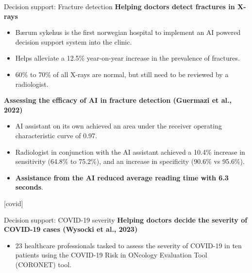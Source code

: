 \documentclass[8pt]{beamer}
\begin{document}
	\begin{frame}[t]{Decision support: Fracture detection}
		\textbf{Helping doctors detect fractures in X-rays}\\
		\begin{itemize}
			\item Bærum sykehus is the first norwegian hospital to implement an AI powered decision support system into the clinic.
			\item Helps alleviate a 12.5\% year-on-year increase in the prevalence of fractures.
			\item 60\% to 70\% of all X-rays are normal, but still need to be reviewed by a radiologist.
		\end{itemize}
		\textbf{Assessing the efficacy of AI in fracture detection (Guermazi et al., 2022)}\\
		\begin{itemize}
			\item AI assistant on its own achieved an area under the receiver operating characteristic curve of 0.97.
			\item Radiologist in conjunction with the AI assistant achieved a 10.4\% increase in sensitivity (64.8\% to 75.2\%), and an increase in specificity (90.6\% vs 95.6\%).
			\item \textbf{Assistance from the AI reduced average reading time with 6.3 seconds}.
		\end{itemize}
	\end{frame}

	[covid]

	\begin{frame}[t]{Decision support: COVID-19 severity}
		\textbf{Helping doctors decide the severity of COVID-19 cases (Wysocki et al., 2023)}\\
		\begin{itemize}
			\item 23 healthcare professionals tasked to assess the severity of COVID-19 in ten patients using the COVID-19 Risk in ONcology Evaluation Tool (CORONET) tool.
		\end{itemize}
		\vspace{0.5cm}
		\centering
	\end{frame}
\end{document}
